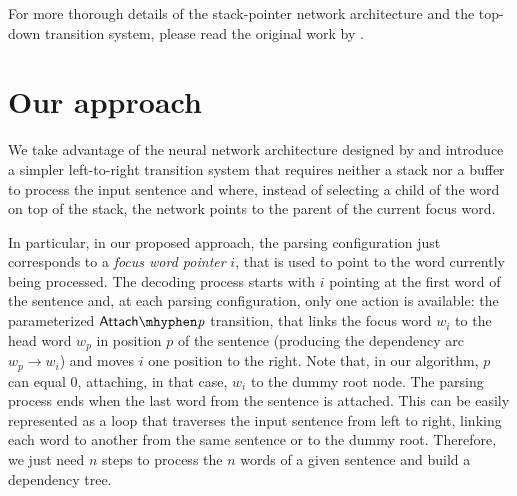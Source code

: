 \documentclass[11pt,a4paper]{article}
\newcommand{\transname}[1]{\ensuremath{\mathsf{#1}}}
\newcommand{\at}{\transname{Attach\mhyphen \textit{p}}}
\begin{document}
For more thorough details of the stack-pointer network architecture and the top-down transition system, please read the original work by \citet{Ma18}.


\section{Our approach}
We take advantage of the 
neural network architecture designed by \citet{Ma18} and introduce a simpler left-to-right transition system that requires neither a stack nor a buffer to process the input sentence and where, instead of selecting a child of the word on top of the stack, the network points to the parent of the current focus word.

In particular, in our proposed approach, the parsing configuration just corresponds to a \textit{focus word pointer} $i$, that is used to point to the word currently being processed. The decoding process starts with $i$ pointing at the first word of the sentence and, at each parsing configuration,
only one action is available: the parameterized $\at$ transition, that 
links the focus word $w_i$ to the head word $w_p$ in position $p$ of the sentence (producing the dependency arc $w_p \rightarrow w_i$) and moves $i$ one position to the right. Note that, 
in our algorithm, $p$ can equal 0, attaching, in that case, $w_i$ to the dummy root node. The parsing process ends when the last word from the sentence is attached.
This can be easily represented as a loop that traverses the input sentence from left to right, linking each word to another from the same sentence or to the dummy root. Therefore, we just need $n$ steps to process the $n$ words of a given sentence and build a dependency tree.
\end{document}
